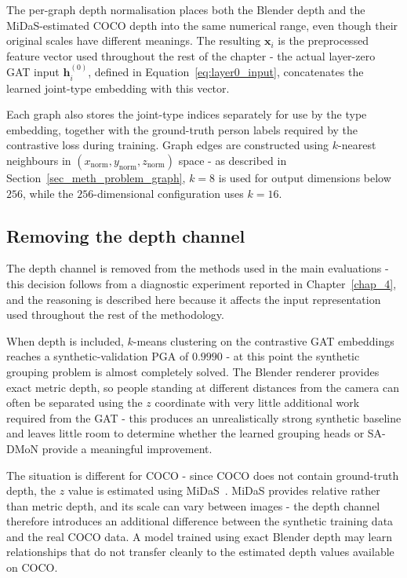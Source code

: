 The per-graph depth normalisation places both the Blender depth
and the MiDaS-estimated COCO depth into the same numerical range,
even though their original scales have different meanings.
The resulting $\mathbf{x}_i$ is the preprocessed feature vector used throughout the rest of the chapter -
the actual layer-zero GAT input $\mathbf{h}_i^{(0)}$,
defined in Equation~\eqref{eq:layer0_input},
concatenates the learned joint-type embedding with this vector.

Each graph also stores the joint-type indices separately for use by the type embedding,
together with the ground-truth person labels required by the contrastive loss during training.
Graph edges are constructed using $k$-nearest neighbours
in $(x_{\text{norm}},y_{\text{norm}},z_{\text{norm}})$ space -
as described in Section~\ref{sec_meth_problem_graph},
$k=8$ is used for output dimensions below $256$,
while the $256$-dimensional configuration uses $k=16$.

\subsection{Removing the depth channel}
\label{sec_meth_data_depth}

The depth channel is removed from the methods used in the main evaluations -
this decision follows from a diagnostic experiment reported in Chapter~\ref{chap_4},
and the reasoning is described here
because it affects the input representation used throughout the rest of the methodology.

When depth is included,
$k$-means clustering on the contrastive GAT embeddings reaches a synthetic-validation PGA of $0.9990$ -
at this point the synthetic grouping problem is almost completely solved.
The Blender renderer provides exact metric depth,
so people standing at different distances from the camera
can often be separated using the $z$ coordinate
with very little additional work required from the GAT -
this produces an unrealistically strong synthetic baseline
and leaves little room to determine
whether the learned grouping heads or SA-DMoN provide a meaningful improvement.

The situation is different for COCO -
since COCO does not contain ground-truth depth,
the $z$ value is estimated using MiDaS~\cite{ranftl2020midas}.
MiDaS provides relative rather than metric depth,
and its scale can vary between images -
the depth channel therefore introduces an additional difference
between the synthetic training data and the real COCO data.
A model trained using exact Blender depth
may learn relationships that do not transfer cleanly
to the estimated depth values available on COCO.

